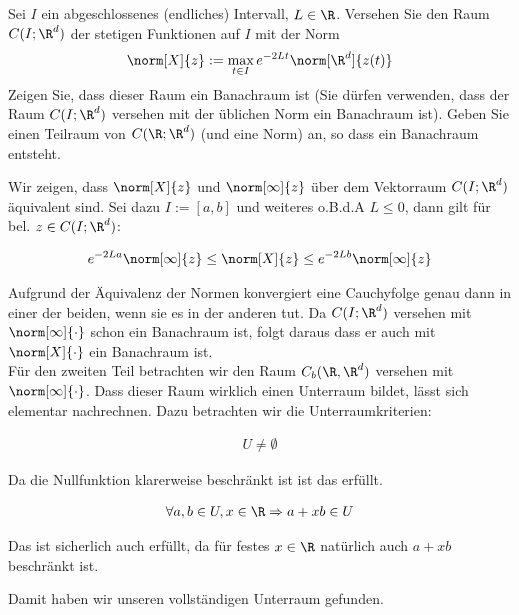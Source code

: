 \begin{exercise}
  Sei $I$ ein abgeschlossenes (endliches) Intervall, $L \in \R$.
  Versehen Sie den Raum $C(I;\R^d)$ der stetigen Funktionen auf $I$ mit der Norm
  \begin{align*}
    \norm[X]{z} := \max_{t\in I}e^{-2Lt}\norm[\R^d]{z(t)}
  \end{align*}
  Zeigen Sie, dass dieser Raum ein Banachraum ist (Sie dürfen verwenden, dass der Raum
  $C(I;\R^d)$ versehen mit der üblichen Norm ein Banachraum ist). Geben Sie einen Teilraum
  von $C(\R;\R^d)$ (und eine Norm) an, so dass ein Banachraum entsteht.
\end{exercise}

\begin{solution}
  Wir zeigen, dass $\norm[X]{z}$ und $\norm[\infty]{z}$ über dem Vektorraum $C(I;\R^d)$
  äquivalent sind. Sei dazu $I:=[a,b]$ und weiteres o.B.d.A $L \leq 0$, dann gilt für bel.
  $z \in C(I;\R^{d})$:

  \begin{align*}
    e^{-2La}\norm[\infty]{z}
    \leq
    \norm[X]{z}
    \leq
    e^{-2Lb}\norm[\infty]{z}
  \end{align*}

  Aufgrund der Äquivalenz der Normen konvergiert eine Cauchyfolge genau dann in einer der beiden,
  wenn sie es in der anderen tut. Da $C(I;\R^d)$ versehen mit $\norm[\infty]{\cdot}$ schon ein Banachraum ist,
  folgt daraus dass er auch mit $\norm[X]{\cdot}$ ein Banachraum ist. \\

  Für den zweiten Teil betrachten wir den Raum $C_{b}(\R,\R^d)$ versehen mit $\norm[\infty]{\cdot}$.
  Dass dieser Raum wirklich einen Unterraum bildet, lässt sich elementar nachrechnen.
  Dazu betrachten wir die Unterraumkriterien:

  \begin{align}
    U \neq \emptyset
  \end{align}

  Da die Nullfunktion klarerweise beschränkt ist ist das erfüllt.

  \begin{align}
    \forall a,b \in U, x \in \R \Rightarrow a+xb \in U
  \end{align}

  Das ist sicherlich auch erfüllt, da für festes $x \in \R$ natürlich auch
  $a+xb$ beschränkt ist.

  Damit haben wir unseren vollständigen Unterraum gefunden.


\end{solution}
